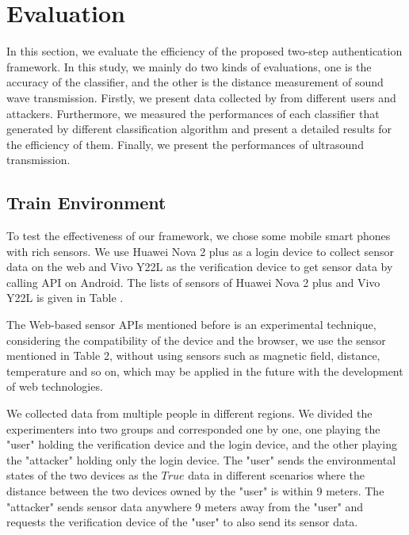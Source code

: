 \section{Evaluation}
\label{sec:Evaluation}

In this section, we evaluate the efficiency of the proposed two-step authentication framework. In this study, we mainly do two kinds of evaluations, one is the accuracy of the classifier, and the other is the distance measurement of sound wave transmission. Firstly, we present data collected by from different users and attackers. Furthermore, we measured the performances of each classifier that generated by different classification algorithm and present a detailed results for the efficiency of them. Finally, we present the performances of ultrasound transmission.

\subsection{Train Environment}
To test the effectiveness of our framework, we chose some mobile smart phones with rich sensors. We use Huawei Nova 2 plus as a login device to collect sensor data on the web and Vivo Y22L as the verification device to get sensor data by calling API on Android. The lists of sensors of Huawei Nova 2 plus and Vivo Y22L is given in Table \uppercase\expandafter{}.




The Web-based sensor APIs mentioned before is an experimental technique, considering the compatibility of the device and the browser, we use the sensor mentioned in Table 2, without using sensors such as magnetic field, distance, temperature and so on, which may be applied in the future with the development of web technologies.

We collected data from multiple people in different regions. We divided the experimenters into two groups and corresponded one by one, one playing the "user" holding the verification device and the login device, and the other playing the "attacker" holding only the login device. The "user" sends the environmental states of the two devices as the $True$ data in different scenarios where the distance between the two devices owned by the "user" is within 9 meters. The "attacker" sends sensor data anywhere 9 meters away from the "user" and requests the verification device of the "user" to also send its sensor data. 


